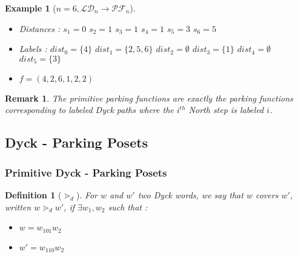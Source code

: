 \documentclass[12pt]{report}
\newtheorem{definition}{Definition}
\newtheorem*{example}{Example}
\newtheorem*{rem}{Remark}
\begin{document}
\begin{example}[$n = 6, \mathcal{LD}_n \to \mathcal{PF}_n$]
\begin{center}
    \end{center}

    \begin{itemize}
        \item Distances :
            \subitem $s_1 = 0$
            \hspace{2cm} $s_2 = 1$
            \hspace{2cm} $s_3 = 1$
            \subitem $s_4 = 1$
            \hspace{2cm} $s_5 = 3$
            \hspace{2cm} $s_6 = 5$
        \item Labels :
            \subitem $dist_0 = \{4\}$
            \hspace{2cm} $dist_1 = \{2, 5, 6\}$
            \hspace{2cm} $dist_2 = \emptyset$
            \subitem $dist_3 = \{1\}$
            \hspace{2cm} $dist_4 = \emptyset$
            \hspace{32mm} $dist_5 = \{3\}$
        \item $f = (4, 2, 6, 1, 2, 2)$
    \end{itemize}
\end{example}

\begin{rem}
    The primitive parking functions are exactly the
    parking functions corresponding to labeled Dyck paths
    where the $i^{th}$ North step is labeled $i$.
\end{rem}

\subsection{Dyck - Parking Posets}

\subsubsection{Primitive Dyck - Parking Posets}

\begin{definition}[$\gtrdot_d$]
    For $w$ and $w'$ two Dyck words, we say that $w$
    covers $w'$, written $w \gtrdot_d w'$, if
    $\exists w_1, w_2$ such that :
    \begin{itemize}
        \item $w = w_101w_2$
        \item $w' = w_110w_2$
    \end{itemize}  
\end{definition}
\end{document}
